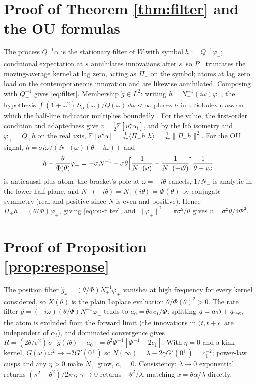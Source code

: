 \documentclass[11pt]{article}
\newcommand{\E}{\mathbb{E}}
\theoremstyle{plain}
\begin{document}
\section{Proof of Theorem \ref{thm:filter} and the OU formulas}
The process $Q_-^{-1}\alpha$ is the stationary filter of $\dot W$ with symbol $h := Q_-^{-1}\varphi_+$; conditional expectation at $s$ annihilates innovations after $s$, so $P_+$ truncates the moving-average kernel at lag zero, acting as $\Pi_+$ on the symbol; atoms at lag zero load on the contemporaneous innovation and are likewise annihilated. Composing with $Q_+^{-1}$ gives \eqref{eq:filter}. Membership $\hat g\in L^2$: writing $h = N_-^{-1}(i\omega)\varphi_+$, the hypothesis $\int(1+\omega^2)\,S_\alpha(\omega)/Q(\omega)\,d\omega<\infty$ places $h$ in a Sobolev class on which the half-line indicator multiplies boundedly \citep[Ch.~1]{LionsMagenes1972}. For the value, the first-order condition and adaptedness give $v = \tfrac12\E[u^\star_t\alpha_t]$, and by the It\^o isometry and $\overline{\varphi_+} = Q_+\overline h$ on the real axis, $\E[u^\star\alpha] = \tfrac{1}{2\pi}\langle\Pi_+h,h\rangle = \tfrac{1}{2\pi}\|\Pi_+h\|^2$. For the OU signal, $h = \sigma i\omega/(N_-(\omega)(\theta-i\omega))$ and
\[
h - \frac{\theta}{\Phi(\theta)}\varphi_+ = -\sigma N_-^{-1} + \sigma\theta\Bigl[\frac{1}{N_-(\omega)} - \frac{1}{N_-(-i\theta)}\Bigr]\frac{1}{\theta-i\omega}
\]
is anticausal-plus-atom: the bracket's pole at $\omega=-i\theta$ cancels, $1/N_-$ is analytic in the lower half-plane, and $N_-(-i\theta) = N_+(i\theta) = \Phi(\theta)$ by conjugate symmetry (real and positive since $N$ is even and positive). Hence $\Pi_+h = (\theta/\Phi)\varphi_+$, giving \eqref{eq:ou-filter}, and $\|\varphi_+\|^2 = \pi\sigma^2/\theta$ gives $v = \sigma^2\theta/4\Phi^2$.

\section{Proof of Proposition \ref{prop:response}}
The position filter $\hat g_x = (\theta/\Phi)N_+^{-1}\varphi_+$ vanishes at high frequency for every kernel considered, so $X(\theta)$ is the plain Laplace evaluation $\theta/\Phi(\theta)^2 > 0$. The rate filter $\hat g = (-i\omega)(\theta/\Phi)N_+^{-1}\varphi_+$ tends to $a_0 = \theta\sigma c_1/\Phi$; splitting $g = a_0\delta + g_{\rm reg}$, the atom is excluded from the forward limit (the innovations in $(t,t+\epsilon]$ are independent of $\alpha_t$), and dominated convergence gives $R = (2\theta/\sigma^2)\,\sigma[\hat g(i\theta) - a_0] = \theta^2\Phi^{-1}[\Phi^{-1}-2c_1]$. With $\eta=0$ and a kink kernel, $\hat G(\omega)\omega^2\to-2G'(0^+)$ so $N(\infty) = \lambda - 2\gamma G'(0^+) = c_1^{-2}$; power-law cusps and any $\eta>0$ make $N_+$ grow, $c_1=0$. Consistency: $\lambda\to0$ exponential returns $(\kappa^2-\theta^2)/2\kappa\gamma$; $\gamma\to0$ returns $-\theta^2/\lambda$, matching $x = \theta\alpha/\lambda$ directly.
\end{document}
